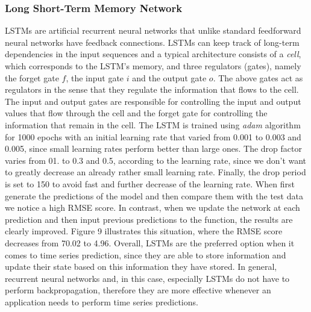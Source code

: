 \documentclass[11pt,conference,compsoc]{IEEEtran}
\begin{document}
\subsubsection{Long Short-Term Memory Network}
LSTMs are artificial recurrent neural networks that unlike standard feedforward neural networks have feedback connections. LSTMs can keep track of long-term dependencies in the input sequences and a typical architecture consists of a \textit{cell}, which corresponds to the LSTM's memory, and three regulators (gates), namely the forget gate $f$, the input gate $i$ and the output gate $o$. The above gates act as regulators in the sense that they regulate the information that flows to the cell. The input and output gates are responsible for controlling the input and output values that flow through the cell and the forget gate for controlling the information that remain in the cell. 
The LSTM is trained using \textit{adam} algorithm for 1000 epochs with an initial learning rate that varied from 0.001 to 0.003 and 0.005, since small learning rates perform better than large ones. The drop factor varies from 01. to 0.3 and 0.5, according to the learning rate, since we don't want to greatly decrease an already rather small learning rate. Finally, the drop period is set to 150 to avoid fast and further decrease of the learning rate. When first generate the predictions of the model and then compare them with the test data we notice a high RMSE score. In contrast, when we update the network at each prediction and then input previous predictions to the function, the results are clearly improved. Figure 9 illustrates this situation, where the RMSE score decreases from 70.02 to 4.96.
Overall, LSTMs are the preferred option when it comes to time series prediction, since they are able to store information and update their state based on this information they have stored. In general, recurrent neural networks and, in this case, especially LSTMs do not have to perform backpropagation, therefore they are more effective whenever an application needs to perform time series predictions.
\end{document}
